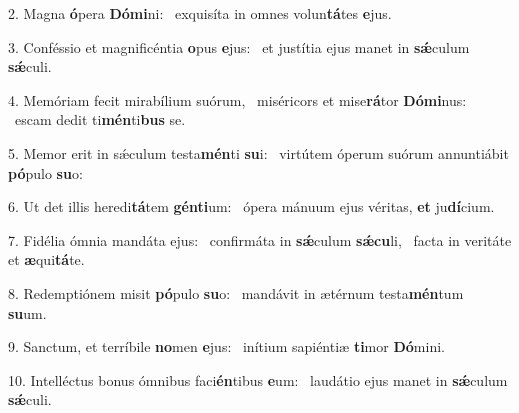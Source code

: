 2. Magna \textbf{ó}pera \textbf{Dó}\textbf{mi}ni: \ast\  exquisíta in omnes volun\textbf{tá}tes \textbf{e}jus.\

3. Conféssio et magnificéntia \textbf{o}pus \textbf{e}jus: \ast\  et justítia ejus manet in \textbf{sǽ}culum \textbf{sǽ}culi.\

4. Memóriam fecit mirabílium suórum, \dag\  miséricors et mise\textbf{rá}tor \textbf{Dó}\textbf{mi}nus: \ast\  escam dedit ti\textbf{mén}ti\textbf{bus} se.\

5. Memor erit in sǽculum testa\textbf{mén}ti \textbf{su}i: \ast\  virtútem óperum suórum annuntiábit \textbf{pó}pulo \textbf{su}o:\

6. Ut det illis heredi\textbf{tá}tem \textbf{gén}\textbf{ti}um: \ast\  ópera mánuum ejus véritas, \textbf{et} ju\textbf{dí}cium.\

7. Fidélia ómnia mandáta ejus: \dag\  confirmáta in \textbf{sǽ}culum \textbf{sǽ}\textbf{cu}li, \ast\  facta in veritáte et \textbf{æ}qui\textbf{tá}te.\

8. Redemptiónem misit \textbf{pó}pulo \textbf{su}o: \ast\  mandávit in ætérnum testa\textbf{mén}tum \textbf{su}um.\

9. Sanctum, et terríbile \textbf{no}men \textbf{e}jus: \ast\  inítium sapiéntiæ \textbf{ti}mor \textbf{Dó}mini.\

10. Intelléctus bonus ómnibus faci\textbf{én}tibus \textbf{e}um: \ast\  laudátio ejus manet in \textbf{sǽ}culum \textbf{sǽ}culi.\

